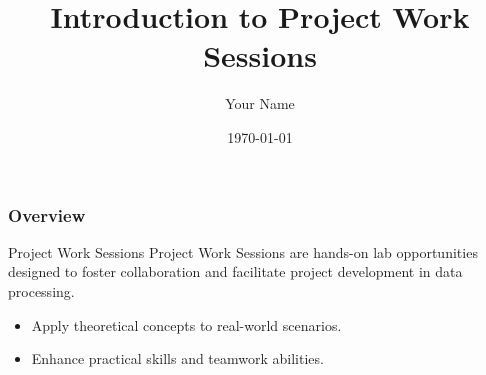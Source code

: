\documentclass[aspectratio=169]{beamer}
\begin{document}
\frame{\titlepage}

\begin{frame}[fragile]
    \title{Introduction to Project Work Sessions}
    \author{Your Name}
    \date{\today}
    \maketitle
\end{frame}

\begin{frame}[fragile]
    \frametitle{Overview}
    \begin{block}{Project Work Sessions}
        Project Work Sessions are hands-on lab opportunities designed to foster collaboration and facilitate project development in data processing. 
    \end{block}
    \begin{itemize}
        \item Apply theoretical concepts to real-world scenarios.
        \item Enhance practical skills and teamwork abilities.
    \end{itemize}
\end{frame}
\end{document}

